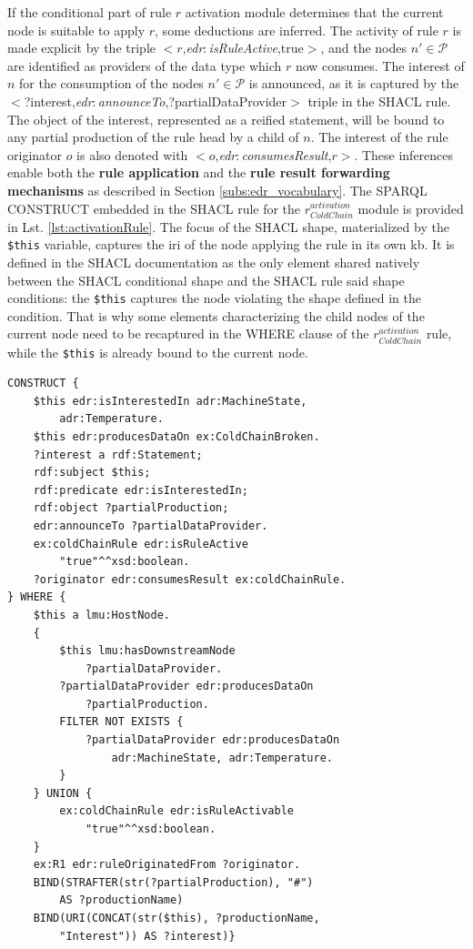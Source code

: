\documentclass{iosart2c}
\newcommand{\namespace}[1]{\textit{#1$:$}}
\newcommand{\concept}[2]{\namespace{#1}\-\textit{#2}}
\newcommand{\triplet}[3]{$<$#1,\textit{#2},#3$>$}
\begin{document}
If the conditional part of rule $r$ activation module determines that the current node is suitable to apply $r$, some deductions are inferred. 
The activity of rule $r$ is made explicit by the triple \triplet{$r$}{\concept{edr}{isRuleActive}}{true}, and the nodes $n'\in \mathcal{P}$ are identified as providers of the data type which $r$ now consumes. 
The interest of $n$ for the consumption of the nodes $n'\in \mathcal{P}$ is announced, as it is captured by the \triplet{?interest}{\concept{edr}{announce\-To}}{?partial\-Data\-Provider} triple in the SHACL rule.
The object of the interest, represented as a reified statement, will be bound to any partial production of the rule head by a child of $n$.
The interest of the rule originator $o$ is also denoted with \triplet{$o$}{\concept{edr}{consumes\-Result}}{$r$}.
These inferences enable both the \textbf{rule application} and the \textbf{rule result forwarding mechanisms} as described in Section \textsection \ref{subs:edr_vocabulary}.
The SPARQL CONSTRUCT embedded in the SHACL rule for the $r_{ColdChain}^{activation}$ module is provided in Lst. \ref{lst:activationRule}.
The focus of the SHACL shape, materialized by the \texttt{\$this} variable, captures the \gls{iri} of the node applying the rule in its own \gls{kb}.
It is defined in the SHACL documentation as the only element shared natively between the SHACL conditional shape and the SHACL rule said shape conditions: the \texttt{\$this} captures the node violating the shape defined in the condition. 
That is why some elements characterizing the child nodes of the current node need to be recaptured in the WHERE clause of the $r_{ColdChain}^{activation}$ rule, while the \texttt{\$this} is already bound to the current node.

\begin{lstlisting}[float, caption=$r_{ColdChain}^{activation}$ rule, label=lst:activationRule]
CONSTRUCT {
	$this edr:isInterestedIn adr:MachineState, 
		adr:Temperature.
	$this edr:producesDataOn ex:ColdChainBroken.
	?interest a rdf:Statement;
	rdf:subject $this;
	rdf:predicate edr:isInterestedIn;
	rdf:object ?partialProduction;
	edr:announceTo ?partialDataProvider.
	ex:coldChainRule edr:isRuleActive 
		"true"^^xsd:boolean.
	?originator edr:consumesResult ex:coldChainRule.
} WHERE {
	$this a lmu:HostNode.
	{
		$this lmu:hasDownstreamNode 
			?partialDataProvider.
		?partialDataProvider edr:producesDataOn 
			?partialProduction.
		FILTER NOT EXISTS {
			?partialDataProvider edr:producesDataOn
				adr:MachineState, adr:Temperature.
		}
	} UNION {
		ex:coldChainRule edr:isRuleActivable 
			"true"^^xsd:boolean.
	}
	ex:R1 edr:ruleOriginatedFrom ?originator.
	BIND(STRAFTER(str(?partialProduction), "#") 
		AS ?productionName)
	BIND(URI(CONCAT(str($this), ?productionName, 
		"Interest")) AS ?interest)}
\end{lstlisting}
\end{document}
